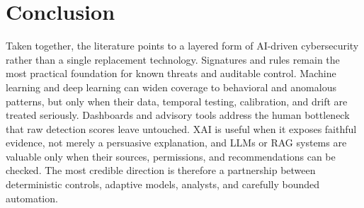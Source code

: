 \documentclass[conference]{IEEEtran}
\begin{document}
\section{Conclusion}
Taken together, the literature points to a layered form of AI-driven cybersecurity rather than a single replacement technology. Signatures and rules remain the most practical foundation for known threats and auditable control. Machine learning and deep learning can widen coverage to behavioral and anomalous patterns, but only when their data, temporal testing, calibration, and drift are treated seriously. Dashboards and advisory tools address the human bottleneck that raw detection scores leave untouched. XAI is useful when it exposes faithful evidence, not merely a persuasive explanation, and LLMs or RAG systems are valuable only when their sources, permissions, and recommendations can be checked. The most credible direction is therefore a partnership between deterministic controls, adaptive models, analysts, and carefully bounded automation.
\end{document}
